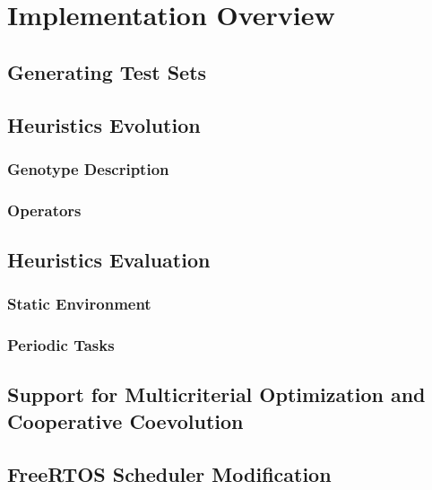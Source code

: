 \chapter{Implementation Overview}
\section{Generating Test Sets}
\section{Heuristics Evolution}
\subsection{Genotype Description}
\subsection{Operators}
\section{Heuristics Evaluation}
\subsection{Static Environment}
\subsection{Periodic Tasks}
\section{Support for Multicriterial Optimization and Cooperative Coevolution}
\section{FreeRTOS Scheduler Modification}